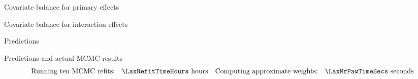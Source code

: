 


\begin{frame}{Covariate balance for primary effects}
\LaxImbalancePrimary{}
\end{frame}


\begin{frame}{Covariate balance for interaction effects}
\LaxImbalanceInteraction{}
\end{frame}




\begin{frame}[t]{Predictions}
    \LaxPredictionFigOne{}
\end{frame}


\begin{frame}[t]{Predictions and actual MCMC results}
    \LaxPredictionFigTwo{}
    \vspace{-3em}
    $$
    \begin{aligned}
        \textrm{Running ten MCMC refits:}\quad & \LaxRefitTimeHours \textrm{ hours} &
        \textrm{Computing approximate weights:}\quad &\LaxMrPawTimeSecs \textrm{ seconds}\\
    \end{aligned}
    $$
\end{frame}



